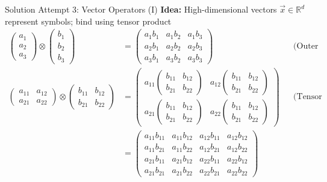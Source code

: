 \documentclass[handout,aspectratio=169]{beamer}
\begin{document}
	\begin{frame}{Solution Attempt 3: Vector Operators (I)}
		\centering
		\textbf{Idea:}  High-dimensional vectors $\vec x \in \mathbb{R}^d$ represent symbols; bind using tensor product\\\vspace*{-0.33cm}
		\small
		\begin{align*}
		\begin{pmatrix}a_1\\a_2\\a_3\end{pmatrix} \otimes \begin{pmatrix}b_1\\b_2\\b_3\end{pmatrix} &=
		\begin{pmatrix}
		a_1 b_1 & a_1 b_2 & a_1 b_3 \\
		a_2 b_1 & a_2 b_2 & a_2 b_3 \\
		a_3 b_1 & a_3 b_2 & a_3 b_3
		\end{pmatrix} && \text{(Outer product)} \\[0.25cm]
		\begin{pmatrix}a_{11} & a_{12} \\ a_{21} & a_{22} \end{pmatrix} \otimes
		\begin{pmatrix}b_{11} & b_{12} \\ b_{21} & b_{22} \end{pmatrix} &=
		\begin{pmatrix}
		a_{11} \begin{pmatrix}b_{11} & b_{12} \\ b_{21} & b_{22} \end{pmatrix} &
		a_{12} \begin{pmatrix}b_{11} & b_{12} \\ b_{21} & b_{22} \end{pmatrix} \\
		a_{21} \begin{pmatrix}b_{11} & b_{12} \\ b_{21} & b_{22} \end{pmatrix} &
		a_{22} \begin{pmatrix}b_{11} & b_{12} \\ b_{21} & b_{22} \end{pmatrix}
		\end{pmatrix} && \text{(Tensor product)}\\ &= 
		\begin{pmatrix}
		a_{11} b_{11} & a_{11} b_{12} & a_{12} b_{11} & a_{12} b_{12} \\
		a_{11} b_{21} & a_{11} b_{22} & a_{12} b_{21} & a_{12} b_{22} \\
		a_{21} b_{11} & a_{21} b_{12} & a_{22} b_{11} & a_{22} b_{12} \\
		a_{21} b_{21} & a_{21} b_{22} & a_{22} b_{21} & a_{22} b_{22}
		\end{pmatrix}
		\end{align*}
	\end{frame}
\end{document}
